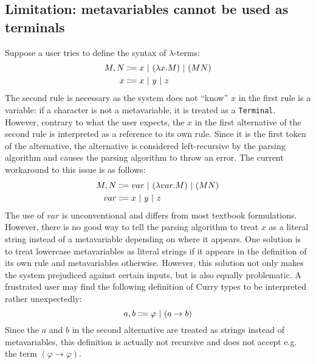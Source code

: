 \subsection{Limitation: metavariables cannot be used as terminals}
Suppose a user tries to define the syntax of $\lambda$-terms:
\begin{align*}
    M, N &\Coloneqq x \ |\  (\lambda x. M) \ |\  (MN) \\
    x &\Coloneqq x \ |\  y \ |\  z
\end{align*}
The second rule is necessary as the system does not ``know'' $x$ in the first rule is a variable: if a character is not a metavariable, it is treated as a \lstinline{Terminal}. However, contrary to what the user expects, the $x$ in the first alternative of the second rule is interpreted as a reference to its own rule. Since it is the first token of the alternative, the alternative is considered left-recursive by the parsing algorithm and causes the parsing algorithm to throw an error. The current workaround to this issue is as follows:
\begin{align*}
    M, N &\Coloneqq var \ |\  (\lambda var. M) \ |\  (MN) \\
    var &\Coloneqq x \ |\  y \ |\  z
\end{align*}
The use of $var$ is unconventional and differs from most textbook formulations. However, there is no good way to tell the parsing algorithm to treat $x$ as a literal string instead of a metavariable depending on where it appears. One solution is to treat lowercase metavariables as literal strings if it appears in the definition of its own rule and metavariables otherwise. However, this solution not only makes the system prejudiced against certain inputs, but is also equally problematic. A frustrated user may find the following definition of Curry types to be interpreted rather unexpectedly:
\[
  a, b \Coloneqq \varphi \ |\  (a \to b)
\]
Since the $a$ and $b$ in the second alternative are treated as strings instead of metavariables, this definition is actually not recursive and does not accept e.g. the term $(\varphi \to \varphi)$.